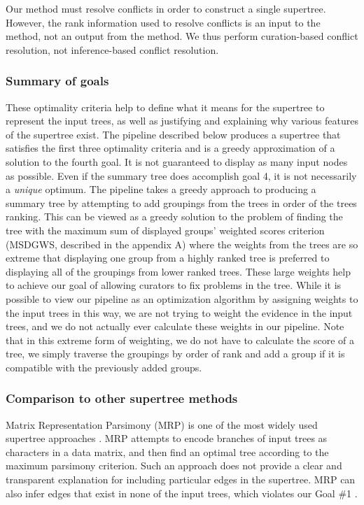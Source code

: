 \documentclass[fleqn,12pt,lineno,english]{wlpeerj}
\begin{document}
Our method must resolve conflicts in order to construct a single supertree.  However, the rank information used to resolve conflicts is an input to the method, not an output from the method.  We thus perform curation-based conflict resolution, not inference-based conflict resolution.

\subsubsection{Summary of goals}

These optimality criteria help to define what it means for the supertree
to represent the input trees, as well as justifying and explaining
why various features of the supertree exist. The pipeline described
below produces a supertree that satisfies the first three optimality
criteria and is a greedy approximation of a solution to the fourth
goal. It is not guaranteed to display as many input nodes as possible.
Even if the summary tree does accomplish goal 4, it is not necessarily
a \emph{unique} optimum. The pipeline takes a greedy approach to producing
a summary tree by attempting to add groupings from the trees in order
of the trees ranking. This can be viewed as a greedy solution to the
problem of finding the tree with the maximum sum of displayed groups'
weighted scores criterion (MSDGWS, described in the appendix A) where the
weights from the trees are so extreme that displaying one group from
a highly ranked tree is preferred to displaying all of the groupings
from lower ranked trees.  These large weights help to achieve our goal of allowing curators to fix problems in the tree.  While it is possible to view our pipeline as an optimization algorithm by assigning weights to the input trees in this way, we are not trying to weight the evidence in the input trees, and we do not actually ever calculate these weights in our pipeline.
Note that in this extreme form of weighting, we do not have to calculate
the score of a tree, we simply traverse the groupings by order of rank
and add a group if it is compatible with the previously added groups.

\subsubsection{Comparison to other supertree methods}

Matrix Representation Parsimony (MRP) is one of the
most widely used supertree approaches \citep{baum1992combining,BinindaEmonds2007b,Davis2014}.
MRP attempts to encode branches of input trees as characters in a data
matrix, and then find an optimal tree according to the maximum
parsimony criterion. Such an approach does not provide a clear and transparent
explanation for including particular edges in the supertree.
MRP can also infer edges that exist in none of the input trees, which 
violates our Goal \#1 \citep{gatesy2004critique}.
\end{document}
